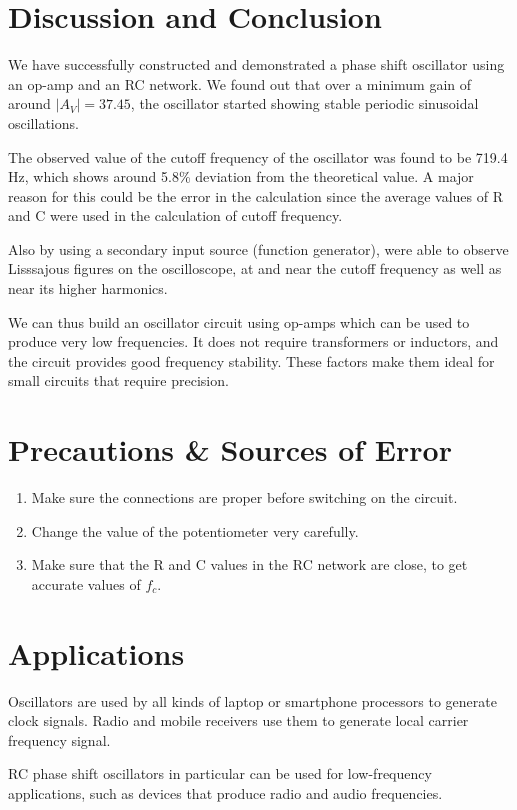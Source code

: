 \section{Discussion and Conclusion}

We have successfully constructed and demonstrated a phase shift oscillator using an op-amp and an RC network. We found out that over a minimum gain of around $|A_V|=37.45$, the oscillator started showing stable periodic sinusoidal oscillations.

The observed value of the cutoff frequency of the oscillator was found to be 719.4 Hz, which shows around 5.8\% deviation from the theoretical value. A major reason for this could be the error in the calculation since the average values of R and C were used in the calculation of cutoff frequency.

Also by using a secondary input source (function generator), were able to observe Lisssajous figures on the oscilloscope, at and near the cutoff frequency as well as near its higher harmonics.

We can thus build an oscillator circuit using op-amps which can be used to produce very low frequencies. It does not require transformers or inductors, and the circuit provides good frequency stability. These factors make them ideal for small circuits that require precision.

\section{Precautions \& Sources of Error}

\begin{enumerate}
    \item Make sure the connections are proper before switching on the circuit.
    \item Change the value of the potentiometer very carefully.
    \item Make sure that the R and C values in the RC network are close, to get accurate values of $f_c$.
\end{enumerate}

\section{Applications}
Oscillators are used by all kinds of laptop or smartphone processors to generate clock signals. Radio and mobile receivers use them to generate local carrier frequency signal.

RC phase shift oscillators in particular can be used for low-frequency applications, such as devices that produce radio and audio frequencies.
